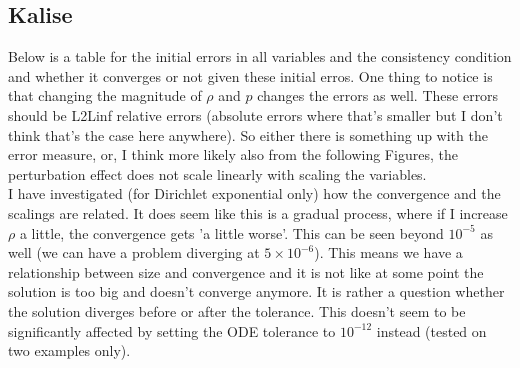 \documentclass[11pt, a4paper]{article}
\theoremstyle{definition}
\begin{document}
\subsection{Kalise}
Below is a table for the initial errors in all variables and the consistency condition and whether it converges or not given these initial erros. One thing to notice is that changing the magnitude of $\rho$ and $p$ changes the errors as well. These errors should be L2Linf relative errors (absolute errors where that's smaller but I don't think that's the case here anywhere). So either there is something up with the error measure, or, I think more likely also from the following Figures, the perturbation effect does not scale linearly with scaling the variables.\\
I have investigated (for Dirichlet exponential only) how the convergence and the scalings are related. It does seem like this is a gradual process, where if I increase $\rho$ a little, the convergence gets 'a little worse'. This can be seen beyond $10^{-5}$ as well (we can have a problem diverging at $5 \times 10^{-6}$). This means we have a relationship between size and convergence and it is not like at some point the solution is too big and doesn't converge anymore. It is rather a question whether the solution diverges before or after the tolerance. This doesn't seem to be significantly affected by setting the ODE tolerance to $10^{-12}$ instead (tested on two examples only).
\end{document}
